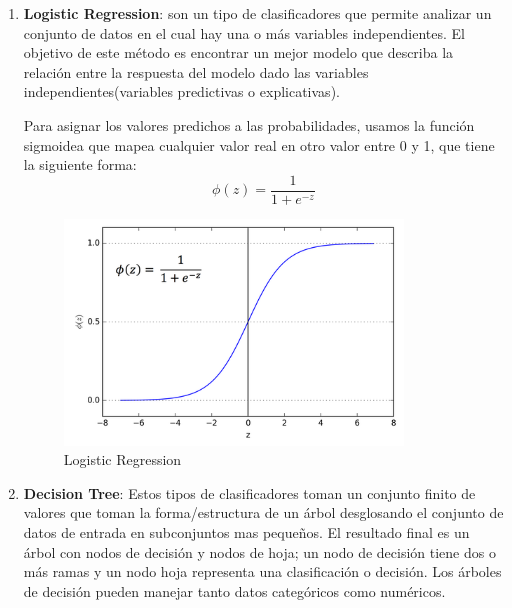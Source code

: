 \begin{enumerate}
\item \textbf{Logistic Regression}: son un tipo de clasificadores que permite analizar un conjunto de datos en el cual hay una o más variables independientes. El objetivo de este método es encontrar un mejor modelo que describa la relación entre la respuesta del modelo dado las variables independientes(variables predictivas o explicativas). 

Para asignar los valores predichos a las probabilidades, usamos la función sigmoidea que mapea cualquier valor real en otro valor entre 0 y 1, que tiene la siguiente forma:
\begin{equation}
\phi(z) = \frac{1}{1+e^{-z}}
\end{equation}

\begin{figure}[H]
 \centering
  \includegraphics[height=6cm,keepaspectratio=true,clip=true]{imagenes/MarcoTeorico/sigmoide.png}
  \caption{Logistic Regression}
	\label{Fig: log_reg}
\end{figure}


\item \textbf{Decision Tree}: Estos tipos de clasificadores toman un conjunto finito de valores  que toman la forma/estructura de un árbol desglosando el conjunto de datos de entrada en subconjuntos mas pequeños. El resultado final es un árbol con nodos de decisión y nodos de hoja; un nodo de decisión tiene dos o más ramas y un nodo hoja representa una clasificación o decisión. Los árboles de decisión pueden manejar tanto datos categóricos como numéricos.
	

\end{enumerate}
